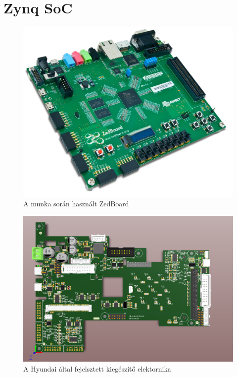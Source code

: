 \chapter*{Zynq SoC}

\begin{figure}[!ht]
	\centering
	\includegraphics[width = \textwidth]{figures/1381869368208.jpg}
	\caption{A munka során használt ZedBoard} 
	\label{fig:zedboard}
\end{figure}

\begin{figure}[!ht]
	\centering
	\includegraphics[width = \textwidth]{figures/kieg_nyak.png}
	\caption{A Hyundai által fejelsztett kiegészítő elektornika} 
	\label{fig:kiegnyak}
\end{figure}

